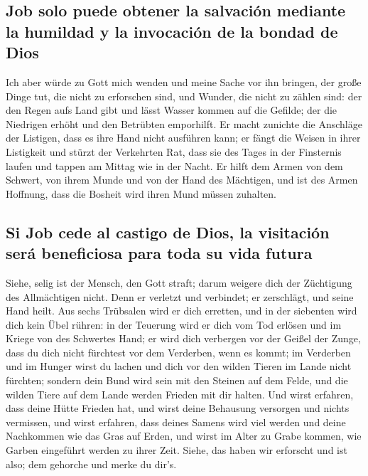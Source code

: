 \hypertarget{job-solo-puede-obtener-la-salvaciuxf3n-mediante-la-humildad-y-la-invocaciuxf3n-de-la-bondad-de-dios}{%
\subsection{Job solo puede obtener la salvación mediante la humildad y
la invocación de la bondad de
Dios}\label{job-solo-puede-obtener-la-salvaciuxf3n-mediante-la-humildad-y-la-invocaciuxf3n-de-la-bondad-de-dios}}

 Ich aber würde zu Gott mich wenden und meine Sache vor
ihn bringen,  der große Dinge tut, die nicht zu erforschen
sind, und Wunder, die nicht zu zählen sind:  der den
Regen aufs Land gibt und lässt Wasser kommen auf die Gefilde;
 der die Niedrigen erhöht und den Betrübten emporhilft.
 Er macht zunichte die Anschläge der Listigen, dass es
ihre Hand nicht ausführen kann;  er fängt die Weisen in
ihrer Listigkeit und stürzt der Verkehrten Rat,  dass sie
des Tages in der Finsternis laufen und tappen am Mittag wie in der
Nacht.  Er hilft dem Armen von dem Schwert, von ihrem
Munde und von der Hand des Mächtigen,  und ist des Armen
Hoffnung, dass die Bosheit wird ihren Mund müssen zuhalten.

\hypertarget{si-job-cede-al-castigo-de-dios-la-visitaciuxf3n-seruxe1-beneficiosa-para-toda-su-vida-futura}{%
\subsection{Si Job cede al castigo de Dios, la visitación será
beneficiosa para toda su vida
futura}\label{si-job-cede-al-castigo-de-dios-la-visitaciuxf3n-seruxe1-beneficiosa-para-toda-su-vida-futura}}

 Siehe, selig ist der Mensch, den Gott straft; darum
weigere dich der Züchtigung des Allmächtigen nicht.  Denn
er verletzt und verbindet; er zerschlägt, und seine Hand heilt.
 Aus sechs Trübsalen wird er dich erretten, und in der
siebenten wird dich kein Übel rühren:  in der Teuerung
wird er dich vom Tod erlösen und im Kriege von des Schwertes Hand;
 er wird dich verbergen vor der Geißel der Zunge, dass du
dich nicht fürchtest vor dem Verderben, wenn es kommt; 
im Verderben und im Hunger wirst du lachen und dich vor den wilden
Tieren im Lande nicht fürchten;  sondern dein Bund wird
sein mit den Steinen auf dem Felde, und die wilden Tiere auf dem Lande
werden Frieden mit dir halten.  Und wirst erfahren, dass
deine Hütte Frieden hat, und wirst deine Behausung versorgen und nichts
vermissen,  und wirst erfahren, dass deines Samens wird
viel werden und deine Nachkommen wie das Gras auf Erden, 
und wirst im Alter zu Grabe kommen, wie Garben eingeführt werden zu
ihrer Zeit.  Siehe, das haben wir erforscht und ist also;
dem gehorche und merke du dir's.

